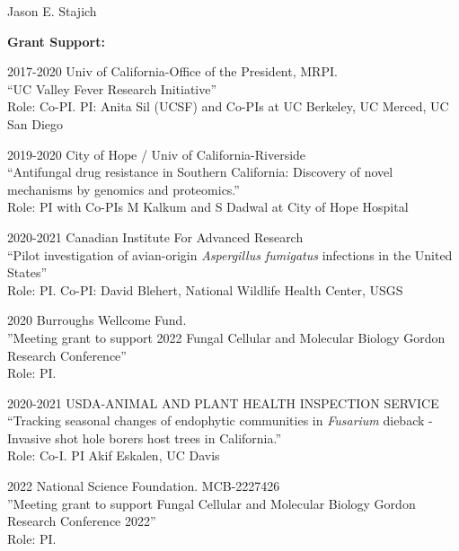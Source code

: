 \documentclass[10pt]{article}
\begin{document}
\begin{cv}{\centerline{Jason E. Stajich}}
\begin{cvlistcompact}{\bf Grant Support:}
\item [2017-2020] Univ of California-Office of the President, MRPI. \\
``UC Valley Fever Research Initiative'' \\
Role: Co-PI.  PI: Anita Sil (UCSF) and Co-PIs at UC Berkeley, UC Merced,
UC San Diego

\item [2019-2020] City of Hope / Univ of California-Riverside \\
``Antifungal drug resistance in Southern California: Discovery of
  novel mechanisms by genomics and proteomics.'' \\
Role: PI with Co-PIs M Kalkum and S Dadwal at City of Hope Hospital

\item [2020-2021] Canadian Institute For Advanced Research \\
  ``Pilot investigation of avian-origin \textit{Aspergillus fumigatus} infections
in the United States'' \\
Role: PI. Co-PI: David Blehert, National Wildlife Health Center, USGS

\item [2020] Burroughs Wellcome Fund. \\
''Meeting grant to support 2022 Fungal Cellular and Molecular Biology Gordon Research Conference'' \\
Role: PI.

\item [2020-2021] USDA-ANIMAL AND PLANT HEALTH INSPECTION SERVICE \\
``Tracking seasonal changes of endophytic communities in \textit{Fusarium} dieback - Invasive shot hole borers host trees in California.'' \\
Role: Co-I. PI Akif Eskalen, UC Davis

\item [2022] National Science Foundation. MCB-2227426 \\
''Meeting grant to support Fungal Cellular and Molecular Biology Gordon Research Conference 2022'' \\
Role: PI.

\end{cvlistcompact}

\setlength{\cvlabelwidth}{18mm}


\end{cv}
\end{document}
